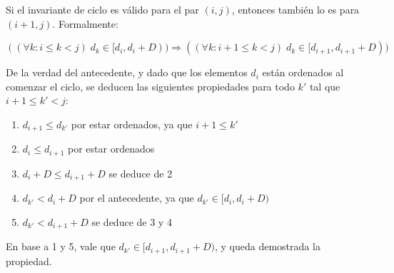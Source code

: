 Si el invariante de ciclo es válido para el par $(i,j)$, entonces también lo es para $(i + 1,j)$. Formalmente:

$$((\forall k: i \leq k < j)\;d_k \in [d_i, d_i + D)) \Rightarrow ((\forall k: i + 1 \leq k < j)\;d_k \in [d_{i+1}, d_{i+1} + D))$$

De la verdad del antecedente, y dado que los elementos $d_i$ están ordenados al comenzar el ciclo, se deducen las siguientes propiedades para todo $k'$ tal que $i + 1 \leq k'< j$:

\begin{enumerate}
  \item $d_{i+1} \leq d_{k'}$               \hfill        por estar ordenados, ya que $i+1 \leq k'$
  \item $d_i \leq d_{i+1}$                  \hfill        por estar ordenados
  \item $d_{i} + D \leq d_{i + 1} +D$       \hfill        se deduce de 2
  \item $d_{k'} < d_i +D$                   \hfill        por el antecedente, ya que $d_{k'} \in [d_i,d_i +D)$
  \item $d_{k'} < d_{i+1} +D$               \hfill        se deduce de 3 y 4
\end{enumerate}

En base a 1 y 5, vale que $d_{k'} \in [d_{i+1}, d_{i+1} + D)$, y queda demostrada la propiedad.